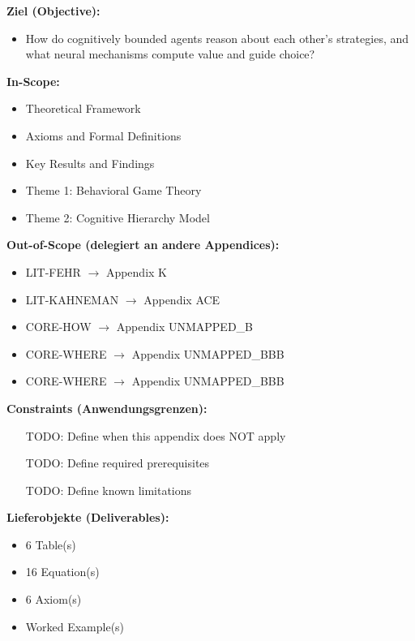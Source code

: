 \begin{tcolorbox}[
    colback=orange!5!white,
    colframe=orange!75!black,
    title={\textbf{Appendix Scope: Ziel / In-Scope / Out-of-Scope / Constraints}},
    fonttitle=\bfseries
]

\textbf{Ziel (Objective):}
\begin{itemize}[nosep]
    \item How do cognitively bounded agents reason about each other's strategies, and what neural mechanisms compute value and guide choice?
\end{itemize}

\textbf{In-Scope:}
\begin{itemize}[nosep]
    \item Theoretical Framework
    \item Axioms and Formal Definitions
    \item Key Results and Findings
    \item Theme 1: Behavioral Game Theory
    \item Theme 2: Cognitive Hierarchy Model
\end{itemize}

\textbf{Out-of-Scope (delegiert an andere Appendices):}
\begin{itemize}[nosep]
    \item LIT-FEHR $\rightarrow$ Appendix K
    \item LIT-KAHNEMAN $\rightarrow$ Appendix ACE
    \item CORE-HOW $\rightarrow$ Appendix UNMAPPED_B
    \item CORE-WHERE $\rightarrow$ Appendix UNMAPPED_BBB
    \item CORE-WHERE $\rightarrow$ Appendix UNMAPPED_BBB
\end{itemize}

\textbf{Constraints (Anwendungsgrenzen):}
\begin{itemize}[nosep]
    \item [TODO: Define when this appendix does NOT apply]
    \item [TODO: Define required prerequisites]
    \item [TODO: Define known limitations]
\end{itemize}

\textbf{Lieferobjekte (Deliverables):}
\begin{itemize}[nosep]
    \item 6 Table(s)
    \item 16 Equation(s)
    \item 6 Axiom(s)
    \item Worked Example(s)
\end{itemize}

\end{tcolorbox}




